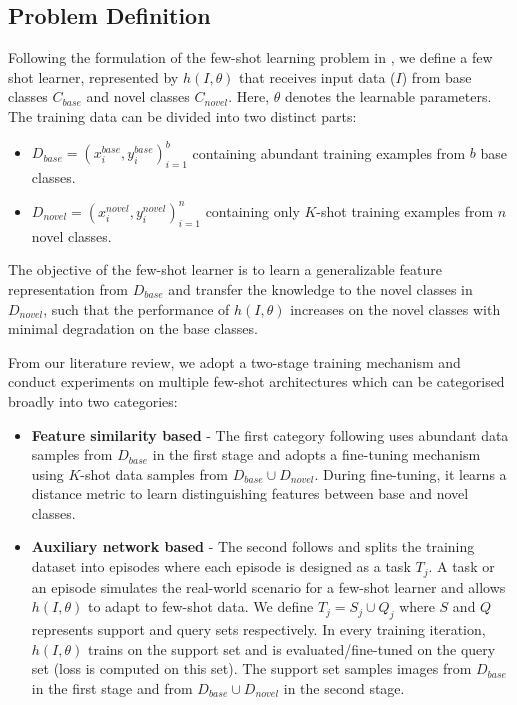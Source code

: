 \documentclass[letterpaper]{article} %
\begin{document}
\subsection{Problem Definition}
\label{approach:prob_def}
Following the formulation of the few-shot learning problem in \cite{reweight,metarcnn}, we define a few shot learner, represented by $h(I,\theta)$ that receives input data ($I$) from base classes $C_{base}$ and novel classes $C_{novel}$. Here, $\theta$ denotes the learnable parameters. The training data can be divided into two distinct parts:
\begin{itemize}
\item $D_{base} = {(x_{i}^{base}, y_{i}^{base})}_{i=1}^{b}$ containing abundant training examples from $b$ base classes.
\item $D_{novel} = {(x_{i}^{novel}, y_{i}^{novel})}_{i=1}^{n}$ containing only $K$-shot training examples from $n$ novel classes.
\end{itemize}
The objective of the few-shot learner is to learn a generalizable feature representation from $D_{base}$ and transfer the knowledge to the novel classes in $D_{novel}$, such that the performance of $h(I,\theta)$ increases on the novel classes with minimal degradation on the base classes.

From our literature review, we adopt a two-stage training mechanism and conduct experiments on multiple few-shot architectures which can be categorised broadly into two categories:
\begin{itemize}
\item \textbf{Feature similarity based} - The first category following \cite{fsdet} uses abundant data samples from $D_{base}$ in the first stage and adopts a fine-tuning mechanism using $K$-shot data samples from $D_{base} \cup D_{novel}$. During fine-tuning, it learns a distance metric to learn distinguishing features between base and novel classes.
\item \textbf{Auxiliary network based} - The second follows \cite{reweight,addfeat,metarcnn} and splits the training dataset into episodes where each episode is designed as a task $T_{j}$. A task or an episode simulates the real-world scenario for a few-shot learner and allows $h(I,\theta)$ to adapt to few-shot data. We define $T_{j} = S_{j} \cup Q_{j}$ where $S$ and $Q$ represents support and query sets respectively. In every training iteration, $h(I,\theta)$ trains on the support set and is evaluated/fine-tuned on the query set (loss is computed on this set). The support set samples images from $D_{base}$ in the first stage and from $D_{base} \cup D_{novel}$ in the second stage.
\end{itemize}
\end{document}
